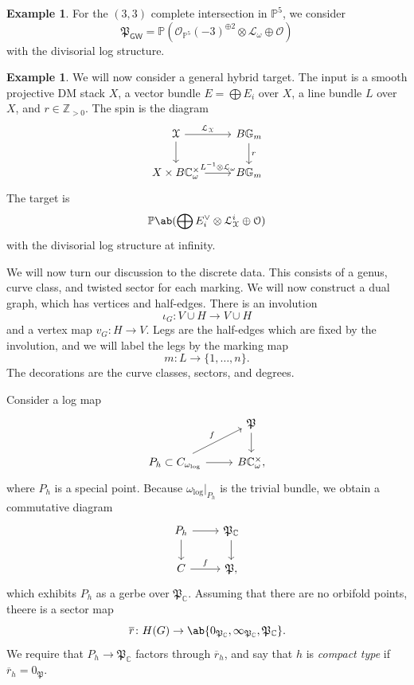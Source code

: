 \documentclass[10pt,oldfontcommands,oneside]{memoir}
\theoremstyle{definition}
\newtheorem{exm}[thm]{Example}
\theoremstyle{remark}
\theoremstyle{plain}
\theoremstyle{definition}
\theoremstyle{remark}
\newcommand{\G}{\mathbb{G}}
\newcommand{\C}{\mathbb{C}}
\newcommand{\Z}{\mathbb{Z}}
\renewcommand{\P}{\mathbb{P}}
\newcommand{\mc}[1]{\mathcal{#1}}
\newcommand{\mf}[1]{\mathfrak{#1}}
\newcommand{\ms}[1]{\mathsf{#1}}
\newcommand{\ol}[1]{\overline{#1}}
\newcommand{\1}{\mathbf{1}}
\newcommand{\2}{\mathbf{2}}
\newcommand{\3}{\mathbf{3}}
\newcommand{\GW}{\ms{GW}}
\begin{document}
\begin{exm}
    For the $(3,3)$ complete intersection in $\P^5$, we consider
    \[ \mf{P}_{\GW} = \P(\mc{O}_{\P^5}(-3)^{\oplus 2} \otimes \mc{L}_{\omega} \oplus \mc{O}) \]
    with the divisorial log structure.
\end{exm}

\begin{exm}
    We will now consider a general hybrid target. The input is a smooth projective DM stack $X$, a vector bundle $E = \bigoplus E_i$ over $X$, a line bundle $L$ over $X$, and $r \in \Z_{>0}$. The spin is the diagram
    \begin{equation*}
    \begin{tikzcd}
        \mc{X} \ar{r}{\mc{L}_{\mc{X}}} \ar{d} & B \G_m \ar{d}{r} \\
        X \times B \C_{\omega}^{\times} \ar{r}{L^{-1} \otimes \mc{L}_{\omega}} & B \G_m
    \end{tikzcd}
    \end{equation*}
    The target is
    \[ \P\ab(\bigoplus E_i^{\vee} \otimes \mc{L}_{\mc{X}}^i \oplus \mc{O}) \]
    with the divisorial log structure at infinity.
\end{exm}

We will now turn our discussion to the discrete data. This consists of a genus, curve class, and twisted sector for each marking. We will now construct a dual graph, which has vertices and half-edges. There is an involution 
\[\iota_G \colon V \cup H \to V \cup H \]
and a vertex map $v_G \colon H \to V$. Legs are the half-edges which are fixed by the involution, and we will label the legs by the marking map
\[ m \colon L \to \{1,\ldots,n\}. \]
The decorations are the curve classes, sectors, and degrees.

Consider a log map
\begin{equation*}
\begin{tikzcd}
    & \mf{P} \ar{d} \\
    P_h \subset C \ar{ur}{f} \ar{r}_{\omega_{\log}} & B \C_{\omega}^{\times},
\end{tikzcd}
\end{equation*}
where $P_h$ is a special point. Because $\omega_{\log}|_{P_h}$ is the trivial bundle, we obtain a commutative diagram
\begin{equation*}
\begin{tikzcd}
    P_h \ar{r} \ar{d} & \mf{P}_{\C} \ar{d} \\
    C \ar{r}{f} & \mf{P},
\end{tikzcd}
\end{equation*}
which exhibits $P_h$ as a gerbe over $\mf{P}_{\C}$. Assuming that there are no orbifold points, theere is a sector map
\[ \ol{r} \colon H(G) \to \ab\{ 0_{\mf{P}_{\C}}, \infty_{\mf{P}_{\C}}, \mf{P}_{\C}\}. \]
We require that $P_h \to \mf{P}_{\C}$ factors through $\ol{r}_h$, and say that $h$ is \textit{compact type} if $\ol{r}_h = 0_{\mf{P}}$.
\end{document}
